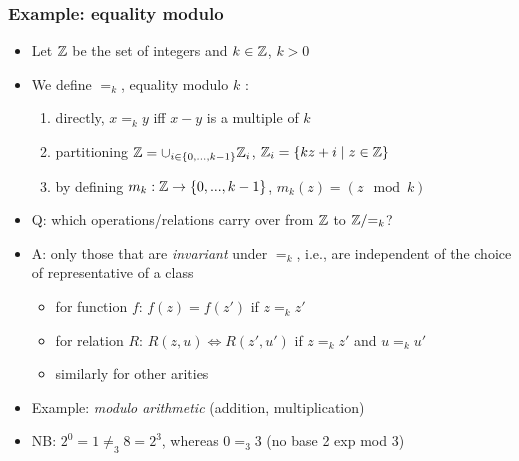\documentclass[handout]{beamer}
\begin{document}
\frame
  {   
    \frametitle{Example: equality modulo}\label{Ch4:EqExa}

 \begin{itemize}[<+->]
\item Let $\mathbb{Z}$ be the set of integers and $k\in\mathbb{Z}$, $k>0$
\item We define $=_k$, equality modulo $k$ :
   \begin{enumerate}[<+->]
\item directly, $x =_k y$ iff $x-y$ is a multiple of $k$
\item partitioning $\mathbb{Z} = \cup_{i\in \{0,...,k-1\}} \mathbb{Z}_i $, $\mathbb{Z}_i = \{kz+i \mid z\in\mathbb{Z}\}$
\item by defining  $m_k: \mathbb{Z}\to \{0,...,k-1\}$, $m_k(z) = (z \mod k)$ 
   \end{enumerate}
\item Q: which operations/relations carry over from $\mathbb{Z}$ to $\mathbb{Z}/{=_k}$?
\item A: only those that are \emph{invariant} under ${=_k}$, i.e., are
independent of the choice of representative of a class
   \begin{itemize}[<+->]
\item for function $f$:  $f(z) = f(z')$ if $z =_k z'$ 
\item for relation $R$:  $R(z,u) \iff R(z',u')$    if $z =_k z'$ and $u =_k u'$
\item similarly for other arities
   \end{itemize}
\item Example: \emph{modulo arithmetic} (addition, multiplication)
\item {\color{red}NB}: $2^0 = 1 \neq_3 8 = 2^3$, whereas $0 =_3 3$ (no base 2 exp mod 3)
 \end{itemize}

 }
\end{document}
